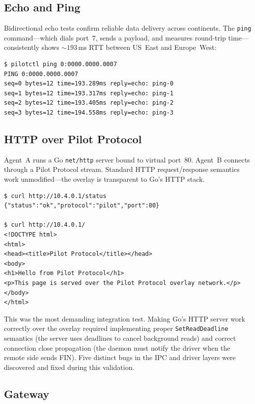 \documentclass[11pt,a4paper]{article}
\begin{document}
\subsection{Echo and Ping}

Bidirectional echo tests confirm reliable data delivery across continents. The \texttt{ping} command---which dials port~7, sends a payload, and measures round-trip time---consistently shows ${\sim}193$\,ms RTT between US~East and Europe~West:

\begin{lstlisting}[basicstyle=\ttfamily\small]
$ pilotctl ping 0:0000.0000.0007
PING 0:0000.0000.0007
seq=0 bytes=12 time=193.289ms reply=echo: ping-0
seq=1 bytes=12 time=193.317ms reply=echo: ping-1
seq=2 bytes=12 time=193.405ms reply=echo: ping-2
seq=3 bytes=12 time=194.558ms reply=echo: ping-3
\end{lstlisting}

\subsection{HTTP over Pilot Protocol}

Agent~A runs a Go \texttt{net/http} server bound to virtual port~80. Agent~B connects through a Pilot Protocol stream. Standard HTTP request/response semantics work unmodified---the overlay is transparent to Go's HTTP stack.

\begin{lstlisting}[basicstyle=\ttfamily\small]
$ curl http://10.4.0.1/status
{"status":"ok","protocol":"pilot","port":80}

$ curl http://10.4.0.1/
<!DOCTYPE html>
<html>
<head><title>Pilot Protocol</title></head>
<body>
<h1>Hello from Pilot Protocol</h1>
<p>This page is served over the Pilot Protocol overlay network.</p>
</body>
</html>
\end{lstlisting}

This was the most demanding integration test. Making Go's HTTP server work correctly over the overlay required implementing proper \texttt{SetReadDeadline} semantics (the server uses deadlines to cancel background reads) and correct connection close propagation (the daemon must notify the driver when the remote side sends FIN). Five distinct bugs in the IPC and driver layers were discovered and fixed during this validation.

\subsection{Gateway}
\end{document}
